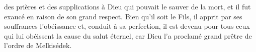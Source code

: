 	des prières et des supplications à Dieu qui pouvait le sauver de la mort,
	et il fut exaucé en raison de son grand respect.
Bien qu’il soit le Fils, il apprit par ses souffrances l’obéissance
	et, conduit à sa perfection,
	il est devenu pour tous ceux qui lui obéissent la cause du salut éternel,
	car Dieu l’a proclamé grand prêtre de l’ordre de Melkisédek.
